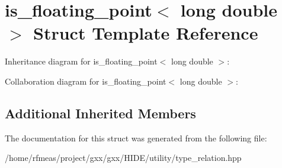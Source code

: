 \hypertarget{structis__floating__point_3_01long_01double_01_4}{}\section{is\+\_\+floating\+\_\+point$<$ long double $>$ Struct Template Reference}
\label{structis__floating__point_3_01long_01double_01_4}


Inheritance diagram for is\+\_\+floating\+\_\+point$<$ long double $>$\+:


Collaboration diagram for is\+\_\+floating\+\_\+point$<$ long double $>$\+:
\subsection*{Additional Inherited Members}


The documentation for this struct was generated from the following file\+:\begin{DoxyCompactItemize}
\item 
/home/rfmeas/project/gxx/gxx/\+H\+I\+D\+E/utility/type\+\_\+relation.\+hpp\end{DoxyCompactItemize}
